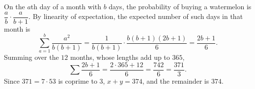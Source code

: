 On the $a$th day of a month with $b$ days, the probability of buying a watermelon is $\dfrac ab\cdot\dfrac{a}{b+1}$. By linearity of expectation, the expected number of such days in that month is
\[\sum_{a=1}^{b}\dfrac{a^2}{b(b+1)}=\dfrac{1}{b(b+1)}\cdot\dfrac{b(b+1)(2b+1)}{6}=\dfrac{2b+1}{6}.\]
Summing over the $12$ months, whose lengths add up to $365$,
\[\sum\dfrac{2b+1}{6}=\dfrac{2\cdot365+12}{6}=\dfrac{742}{6}=\dfrac{371}{3}.\]
Since $371=7\cdot53$ is coprime to $3$, $x+y=374$, and the remainder is $\boxed{374}$.
